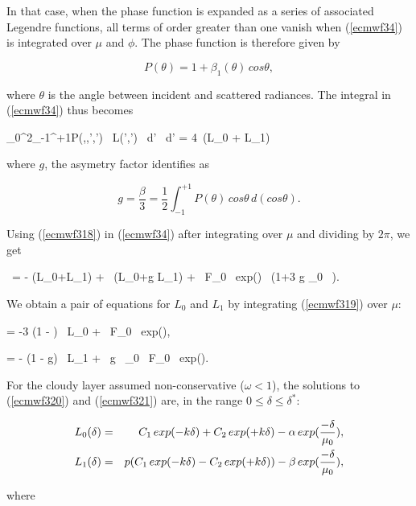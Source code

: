 In that case, when the phase function is expanded as a series of associated Legendre functions, all terms of order greater than one vanish when (\ref{ecmwf34}) is integrated over $\mu$ and $\phi$. The phase function is therefore given by

\medskip
\[
P(\theta) = 1 + \beta_1(\theta) \, cos\theta,
\]
\medskip

\noindent where $\theta$ is the angle between incident and scattered radiances. The integral in (\ref{ecmwf34}) thus becomes

\medskip
\be
\int_0^{2\pi}\!\!\int_{-1}^{+1}{P(\mu,\phi,\mu',\phi') \, L(\mu',\phi') \, d\mu' \, d\phi'} = 4\pi \, (L_0 + \pi L_1)
\label{ecmwf318}
\ee
\medskip

\noindent where $g$, the asymetry factor identifies as

\medskip
\[
g = \frac{\beta}{3} = \frac{1}{2} \int_{-1}^{+1}\!{P(\theta) \, cos\theta \, d(cos\theta)}.
\]
\medskip

Using (\ref{ecmwf318}) in (\ref{ecmwf34}) after integrating over $\mu$ and dividing by $2\pi$, we get

\medskip
\be
\mu \,  = - (L_0+\mu L_1) + \omega \, (L_0+g \mu L_1) +  \omega \, F_0 \, exp() \, (1+3 g \mu_0 \, \mu).
\label{ecmwf319}
\ee
\medskip

We obtain a pair of equations for $L_0$ and $L_1$ by integrating (\ref{ecmwf319}) over $\mu$:

\medskip
\be
{} = -3 (1 - \omega) \, L_0 +  \omega \, F_0 \, exp(),
\label{ecmwf320}
\ee

\be
{} = - (1 - \omega g) \, L_1 +  \omega \, g \, \mu_0 \, F_0 \, exp().
\label{ecmwf321}
\ee
\medskip

For the cloudy layer assumed non-conservative ($\omega < 1$), the solutions to
(\ref{ecmwf320}) and (\ref{ecmwf321}) are, in the range
$0 \leq \delta \leq \delta^{*}$:

\medskip
\begin{eqnarray}\label{ecmwf322}
L_0(\delta) &=& C_1 \, exp(-k\delta) + C_2 \, exp(+k\delta) - \alpha \, exp(\frac{-\delta}{\mu_0}), \cr
L_1(\delta) &=& p (C_1 \, exp(-k\delta) - C_2 \, exp(+k\delta)) - \beta \, exp(\frac{-\delta}{\mu_0}),
\end{eqnarray}
\medskip

\noindent where

